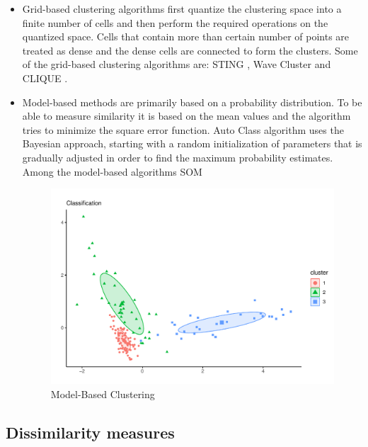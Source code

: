 \begin{itemize}
  \item Grid-based clustering algorithms \cite{b30} first quantize the clustering space into a finite number of cells and then perform the required operations on the quantized space. Cells that contain more than certain number of points are treated as dense and the dense cells are connected to form the clusters. Some of the grid-based clustering algorithms are: STING \cite{b31}, Wave Cluster \cite{b32} and CLIQUE \cite{b33}.
  \item Model-based methods are primarily based on a probability distribution. To be able to measure similarity it is based on the mean values and the algorithm tries to minimize the square error function. Auto Class algorithm uses the Bayesian approach, starting with a random initialization of parameters that is gradually adjusted in order to find the maximum probability estimates. Among the model-based algorithms SOM \cite{b34}
    \begin{figure}[htbp]
  \centering
   \includegraphics[width=14cm]{img/model}
    \caption{Model-Based Clustering}
    \label{fig:model}%
\end{figure}
\end{itemize}

\subsection*{Dissimilarity measures}

